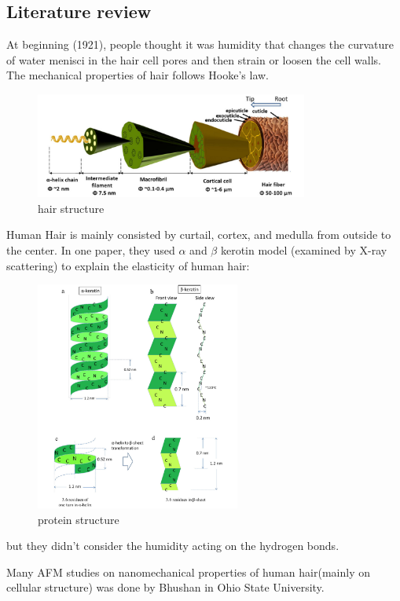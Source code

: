 \documentclass{article}
\begin{document}
\subsection{Literature review}
At beginning (1921), people thought it was humidity that changes the curvature of water menisci in the hair cell pores and then strain or loosen the cell walls. The mechanical properties of hair follows Hooke's law\citep{Whipple_1921}.
\begin{figure}[htbp]
    \centering
\includegraphics[width=0.8\textwidth]{hair structure.jpg}
    \caption{hair structure\citep{yu2017structure}}
    \label{hair structure}
\end{figure}
Human Hair is mainly consisted by curtail, cortex, and medulla from outside to the center. In one paper, they used $\alpha$ and $\beta$ kerotin model (examined by X-ray scattering) to explain the elasticity of human hair:
\begin{figure}[htbp]
    \centering
\includegraphics[width=0.6\textwidth]{protein structure.png}
    \caption{protein structure\citep{yu2017structure}}
    \label{protein structure}
\end{figure}
but they didn't consider the humidity acting on the hydrogen bonds.

Many AFM studies on nanomechanical properties of human hair(mainly on cellular structure) was done by Bhushan in Ohio State University\citep{bhushan2006afm}.
\end{document}
